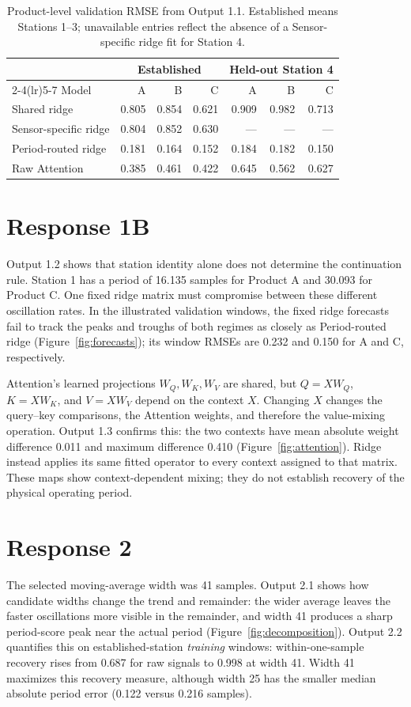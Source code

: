 \documentclass[11pt,a4paper]{article}
\begin{document}
\begin{table}[htbp]
\centering\small
\caption{Product-level validation RMSE from Output 1.1. Established means Stations 1--3; unavailable entries reflect the absence of a Sensor-specific ridge fit for Station 4.}
\label{tab:products}
\begin{tabular}{lrrr rrr}
\toprule
&\multicolumn{3}{c}{Established}&\multicolumn{3}{c}{Held-out Station 4}\\
\cmidrule(lr){2-4}\cmidrule(lr){5-7}
Model&A&B&C&A&B&C\\
\midrule
Shared ridge&0.805&0.854&0.621&0.909&0.982&0.713\\
Sensor-specific ridge&0.804&0.852&0.630&---&---&---\\
Period-routed ridge&0.181&0.164&0.152&0.184&0.182&0.150\\
Raw Attention&0.385&0.461&0.422&0.645&0.562&0.627\\
\bottomrule
\end{tabular}
\end{table}

\section*{Response 1B}
Output 1.2 shows that station identity alone does not determine the continuation rule. Station 1 has a period of 16.135 samples for Product A and 30.093 for Product C. One fixed ridge matrix must compromise between these different oscillation rates. In the illustrated validation windows, the fixed ridge forecasts fail to track the peaks and troughs of both regimes as closely as Period-routed ridge (Figure~\ref{fig:forecasts}); its window RMSEs are 0.232 and 0.150 for A and C, respectively.

Attention's learned projections $W_Q,W_K,W_V$ are shared, but $Q=XW_Q$, $K=XW_K$, and $V=XW_V$ depend on the context $X$. Changing $X$ changes the query--key comparisons, the Attention weights, and therefore the value-mixing operation. Output 1.3 confirms this: the two contexts have mean absolute weight difference 0.011 and maximum difference 0.410 (Figure~\ref{fig:attention}). Ridge instead applies its same fitted operator to every context assigned to that matrix. These maps show context-dependent mixing; they do not establish recovery of the physical operating period.

\section*{Response 2}
The selected moving-average width was 41 samples. Output 2.1 shows how candidate widths change the trend and remainder: the wider average leaves the faster oscillations more visible in the remainder, and width 41 produces a sharp period-score peak near the actual period (Figure~\ref{fig:decomposition}). Output 2.2 quantifies this on established-station \emph{training} windows: within-one-sample recovery rises from 0.687 for raw signals to 0.998 at width 41. Width 41 maximizes this recovery measure, although width 25 has the smaller median absolute period error (0.122 versus 0.216 samples).
\end{document}
